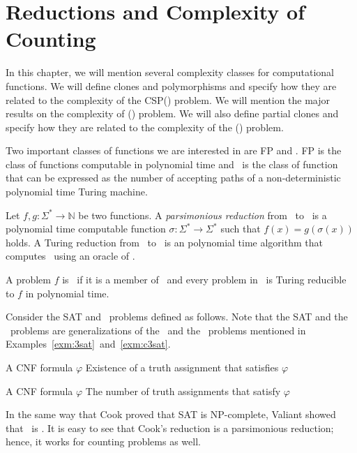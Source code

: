 \chapter{Reductions and Complexity of Counting}
In this chapter, we will mention several complexity classes for computational functions.
We will define clones and polymorphisms and specify how they are related to
the complexity of the CSP(\mrelset) problem. We will mention the major results on the complexity of 
\ccsp(\mrelset) problem. We will also define partial clones and specify
how they are related to the complexity of the \ccsp(\mrelset) problem.

Two important classes of functions we are interested in are FP and \cp\@.
FP is the class of functions computable in polynomial time and \cp\ is
the class of function that can be expressed as the
number of accepting paths of a non-deterministic polynomial time Turing machine. 

Let \(f,g:\Sigma^*\to\mathbb{N}\) be two functions. A \emph{parsimonious reduction}
from \mf\ to \mg\ is a polynomial time computable function
\(\sigma:\Sigma^*\to\Sigma^*\) such that
\(f(x)=g(\sigma(x))\) holds. 
A Turing reduction from \mf\ to \mg\ is an polynomial time algorithm
that computes \mf\ using an oracle of \mg\@.

\begin{defi} 
A problem \(f\) is \cpc\ if it is a member of \cp\ and every problem in \cp\ is 
Turing reducible to \(f\) in polynomial time.
\end{defi}

Consider the SAT and \csat\ problems defined as follows.
Note that the SAT and the \csat\ problems are generalizations of the \tsat\ and
the \ctsat\ problems
mentioned in Examples~\ref{exm:3sat}~and~\ref{exm:c3sat}\@. 

{A CNF formula \(\varphi\)}
{Existence of a truth assignment that satisfies \(\varphi\)}

\pdef{\csat}
{A CNF formula \(\varphi\)}
{The number of truth assignments that satisfy \(\varphi\)}

In the same way that Cook \cite{cook1971} proved that SAT is NP-complete,
Valiant \cite{Valiant1979} showed that \csat\ is \cpc\@. It is easy to see that 
Cook's reduction is a parsimonious reduction; hence, it works for counting problems
as well. 

